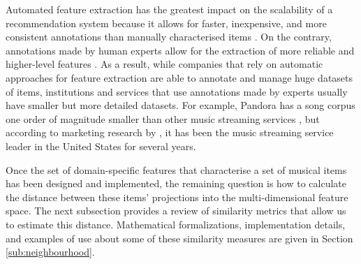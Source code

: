 Automated feature extraction has the greatest impact on the scalability of a recommendation system because it allows for faster, inexpensive, and more consistent annotations than manually characterised items \autocite{brandenburg09music}. 
On the contrary, annotations made by human experts allow for the extraction of more reliable and higher-level features \autocite{tingle10exploring}. 
As a result, while companies that rely on automatic approaches for feature extraction are able to annotate and manage huge datasets of items, institutions and services that use annotations made by experts usually have  smaller but more detailed datasets. For example, Pandora has a song corpus one order of magnitude smaller than other music streaming services \autocite{sydell14pandora}, but according to marketing research by \textcite{infinitedial15}, it has been the music streaming service leader in the United States for several years.






Once the set of domain-specific features that characterise a set of musical items has been designed and implemented, the remaining question is how to calculate the distance between these items' projections into the multi-dimensional feature space. The next subsection provides a review of similarity metrics that allow us to estimate this distance.
Mathematical formalizations, implementation details, and examples of use about some of these similarity measures are given in Section \ref{sub:neighbourhood}.

